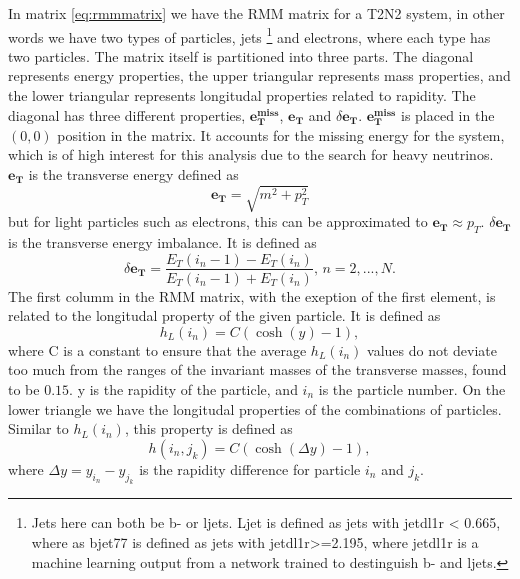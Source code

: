 In matrix \ref{eq:rmmmatrix} we have the RMM matrix for a T2N2 system, in other words we have two types of particles, jets
\footnote{Jets here can both be b- or ljets. Ljet is defined as jets with jetdl1r < 0.665, where as bjet77 is defined as jets with jetdl1r>=2.195, 
where jetdl1r is a machine learning output from a network trained to destinguish b- and ljets.} and electrons, where each type has two particles. 
The matrix itself is partitioned into three parts. 
The diagonal represents energy properties, the upper triangular represents mass properties, and the lower triangular represents longitudal 
properties related to rapidity. The diagonal has three different properties, $\boldsymbol{e_T^{miss}}$, $\boldsymbol{e_T}$ and $\delta\boldsymbol{e_T}$. 
$\boldsymbol{e_T^{miss}}$ is placed in the $(0,0)$ position in the matrix. It accounts for the missing energy for the system, which is of high interest 
for this analysis due to the search for heavy neutrinos. $\boldsymbol{e_T}$ is the transverse energy defined as 
\begin{equation}\label{eq:et}
    \boldsymbol{e_T} = \sqrt{m^2 + p_T^2}
\end{equation}
but for light particles such as electrons, this can be approximated to $\boldsymbol{e_T} \approx p_T$. $\delta\boldsymbol{e_T}$ 
is the transverse energy imbalance. It is defined as 
\begin{equation*}
    \delta\boldsymbol{e_T} = \frac{E_T(i_n-1) - E_T(i_n)}{E_T(i_n-1) + E_T(i_n)}, \, n = 2, ..., N.
\end{equation*}
The first columm in the RMM matrix, with the exeption of the first element, is related to the longitudal property of the given particle. 
It is defined as
\begin{equation*}
    h_L(i_n) = C(\cosh{(y)} - 1),
\end{equation*}
where C is a constant to ensure that the average $h_L(i_n)$ values do not deviate too much from the ranges of the invariant masses 
of the transverse masses, found to be $0.15$\cite{Chekanov_2019}. y is the rapidity of the particle, and $i_n$ is the particle number. 
On the lower triangle we have the longitudal properties of the combinations of particles. Similar to $h_L(i_n)$, this property is defined as 
\begin{equation*}
    h(i_n, j_k) = C(\cosh{(\Delta y)} - 1),
\end{equation*}
where $\Delta y = y_{i_n} - y_{j_k}$ is the rapidity difference for particle $i_n$ and $j_k$. 

